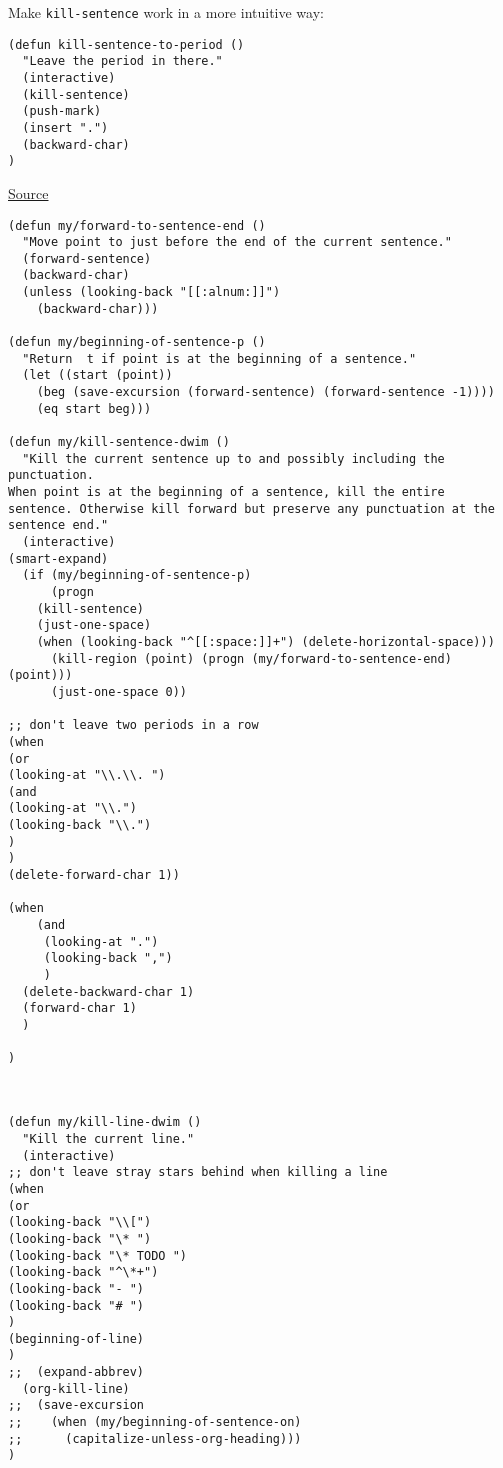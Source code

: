 \documentclass[11pt]{article}
\begin{document}
Make \texttt{kill-sentence} work in a more intuitive way:
\begin{verbatim}
(defun kill-sentence-to-period ()
  "Leave the period in there."
  (interactive)
  (kill-sentence)
  (push-mark)
  (insert ".")
  (backward-char)
)
\end{verbatim}

\href{http://emacs.stackexchange.com/questions/12266/how-change-behavior-of-kill-sentence-based-on-position-in-sentence/12321?iemail=1\&noredirect=1\#12321}{Source}

\begin{verbatim}
(defun my/forward-to-sentence-end ()
  "Move point to just before the end of the current sentence."
  (forward-sentence)
  (backward-char)
  (unless (looking-back "[[:alnum:]]")
    (backward-char)))

(defun my/beginning-of-sentence-p ()
  "Return  t if point is at the beginning of a sentence."
  (let ((start (point))
	(beg (save-excursion (forward-sentence) (forward-sentence -1))))
    (eq start beg)))

(defun my/kill-sentence-dwim ()
  "Kill the current sentence up to and possibly including the punctuation.
When point is at the beginning of a sentence, kill the entire
sentence. Otherwise kill forward but preserve any punctuation at the sentence end."
  (interactive)
(smart-expand)
  (if (my/beginning-of-sentence-p)
      (progn
	(kill-sentence)
	(just-one-space)
	(when (looking-back "^[[:space:]]+") (delete-horizontal-space)))
      (kill-region (point) (progn (my/forward-to-sentence-end) (point)))
      (just-one-space 0))

;; don't leave two periods in a row
(when
(or
(looking-at "\\.\\. ")
(and
(looking-at "\\.")
(looking-back "\\.")
)
)
(delete-forward-char 1))

(when
    (and
     (looking-at ".")
     (looking-back ",")
     )
  (delete-backward-char 1)
  (forward-char 1)
  )

)
\end{verbatim}
\label{sec:org16e58f6}

\begin{verbatim}


(defun my/kill-line-dwim ()
  "Kill the current line."
  (interactive)
;; don't leave stray stars behind when killing a line
(when
(or
(looking-back "\\[")
(looking-back "\* ")
(looking-back "\* TODO ")
(looking-back "^\*+")
(looking-back "- ")
(looking-back "# ")
)
(beginning-of-line)
)
;;  (expand-abbrev)
  (org-kill-line)
;;  (save-excursion
;;    (when (my/beginning-of-sentence-on)
;;      (capitalize-unless-org-heading)))
)
\end{verbatim}
\end{document}
